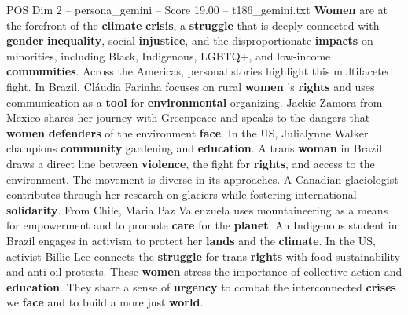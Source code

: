 \begin{textsample}{POS Dim 2 – persona\_gemini – Score 19.00 – t186\_gemini.txt}  \label{ex:f2_pos_050}
\textbf{Women} are at the forefront of the \textbf{climate} \textbf{crisis}, a \textbf{struggle} that is deeply connected with \textbf{gender} \textbf{inequality}, social \textbf{injustice}, and the disproportionate \textbf{impacts} on minorities, including Black, Indigenous, LGBTQ+, and low-income \textbf{communities}.
Across the Americas, personal stories highlight this multifaceted fight.
In Brazil, Cláudia Farinha focuses on rural \textbf{women} 's \textbf{rights} and uses communication as a \textbf{tool} for \textbf{environmental} organizing.
Jackie Zamora from Mexico shares her journey with Greenpeace and speaks to the dangers that \textbf{women} \textbf{defenders} of the environment \textbf{face}.
In the US, Julialynne Walker champions \textbf{community} gardening and \textbf{education}.
A trans \textbf{woman} in Brazil draws a direct line between \textbf{violence}, the fight for \textbf{rights}, and access to the environment.
The movement is diverse in its approaches.
A Canadian glaciologist contributes through her research on glaciers while fostering international \textbf{solidarity}.
From Chile, Maria Paz Valenzuela uses mountaineering as a means for empowerment and to promote \textbf{care} for the \textbf{planet}.
An Indigenous student in Brazil engages in activism to protect her \textbf{lands} and the \textbf{climate}.
In the US, activist Billie Lee connects the \textbf{struggle} for trans \textbf{rights} with food sustainability and anti-oil protests.
These \textbf{women} stress the importance of collective action and \textbf{education}.
They share a sense of \textbf{urgency} to combat the interconnected \textbf{crises} we \textbf{face} and to build a more just \textbf{world}.

\end{textsample}
